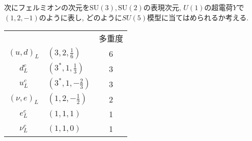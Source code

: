\documentclass[uplatex,dvipdfmx,a4paper,titlepage]{jsbook}
\theoremstyle{plain}
\theoremstyle{definition}
\begin{document}
{次にフェルミオンの次元を$\mathrm{SU}(3), \mathrm{SU}(2)$の表現次元, $U(1)$の超電荷$Y$で $(1, 2, -1)$のように表し, どのように$SU(5)$模型に当てはめられるか考える.
\begin{center}
\begin{tabular}{clc}
             &                         & 多重度 \\
  $(u, d)_L$ & $(3  , 2, \frac{1}{6})$ &      6 \\
    $d_L^c $ & $(3^*, 1, \frac{1}{3})$ &      3 \\ 
    $u_L^c $ & $(3^*, 1,-\frac{2}{3})$ &      3 \\ 
$(\nu, e)_L$ & $(1  , 2,-\frac{1}{2})$ &      2 \\ 
     $e_L^c$ & $(1  , 1,           1)$ &      1 \\ 
   $\nu_L^c$ & $(1  , 1,           0)$ &      1 \\ 
\end{tabular}
\end{center}

}
\end{document}
